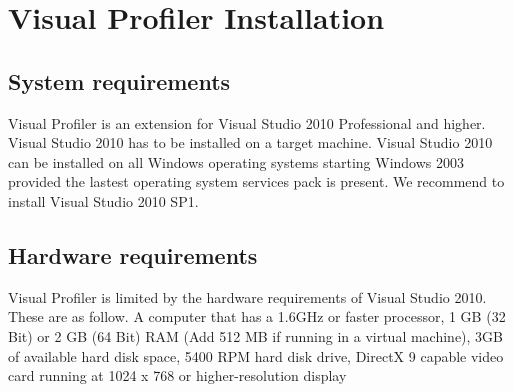 \chapter{Visual Profiler Installation}
\label{chap:Installation}

\section{System requirements}
Visual Profiler is an extension for Visual Studio 2010 Professional and higher. Visual Studio 2010 has to be installed on a target machine. Visual Studio 2010 can be installed on all Windows operating systems starting Windows 2003 provided the lastest operating system services pack is present. We recommend to install Visual Studio 2010 SP1.

\section{Hardware requirements}
Visual Profiler is limited by the hardware requirements of Visual Studio 2010. These are as follow. A computer that has a 1.6GHz or faster processor, 1 GB (32 Bit) or 2 GB (64 Bit) RAM (Add 512 MB if running in a virtual machine), 3GB of available hard disk space, 5400 RPM hard disk drive, DirectX 9 capable video card running at 1024 x 768 or higher-resolution display 	

